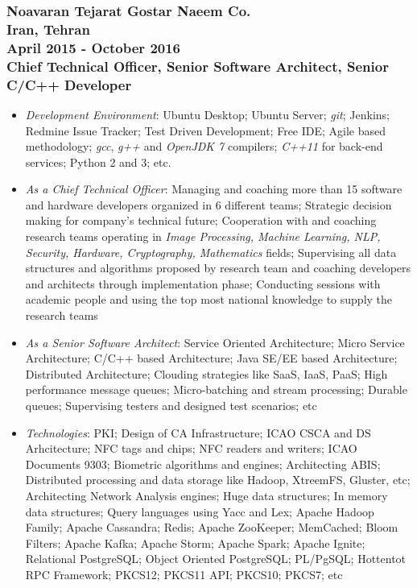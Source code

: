 \documentclass[10pt,a4paper]{article}
\begin{document}
\subsubsection{{\large Noavaran Tejarat Gostar Naeem Co.} \\ 
\textnormal{Iran, Tehran} \\ 
\textnormal{April 2015 - October 2016} \\ 
{Chief Technical Officer, Senior Software Architect, Senior C/C++ Developer}}
  \setlength{\leftskip}{0.5cm}
  \setlength{\rightskip}{1cm}
  \begin{itemize}
    \setlength{\rightskip}{1cm}
    \setlength\itemsep{0em}
    \item \small \textit {Development Environment}: Ubuntu Desktop; Ubuntu Server; \textit{git}; Jenkins; Redmine Issue Tracker; Test Driven Development; Free IDE; Agile based methodology; \textit {gcc}, \textit{g++} and \textit{OpenJDK 7} compilers; \textit{C++11} for back-end services; Python 2 and 3; etc.
    \item \small \textit {As a Chief Technical Officer}: Managing and coaching more than 15 software and hardware developers organized in 6 different teams; Strategic decision making for company's technical future; Cooperation with and coaching research teams operating in \textit {Image Processing, Machine Learning, NLP, Security, Hardware, Cryptography, Mathematics} fields; Supervising all data structures and algorithms proposed by research team and coaching developers and architects through implementation phase; Conducting sessions with academic people and using the top most national knowledge to supply the research teams
    \item \small \textit {As a Senior Software Architect}: Service Oriented Architecture; Micro Service Architecture; C/C++ based Architecture; Java SE/EE based Architecture; Distributed Architecture; Clouding strategies like SaaS, IaaS, PaaS; High performance message queues; Micro-batching and stream processing; Durable queues; Supervising testers and designed test scenarios; etc
    \item \small \textit {Technologies}: PKI; Design of CA Infrastructure; ICAO CSCA and DS Arhcitecture; NFC tags and chips; NFC readers and writers; ICAO Documents 9303; Biometric algorithms and engines; Architecting ABIS; Distributed processing and data storage like Hadoop, XtreemFS, Gluster, etc; Architecting Network Analysis engines; Huge data structures; In memory data structures; Query languages using Yacc and Lex; Apache Hadoop Family; Apache Cassandra; Redis; Apache ZooKeeper; MemCached; Bloom Filters; Apache Kafka; Apache Storm; Apache Spark; Apache Ignite; Relational PostgreSQL; Object Oriented PostgreSQL; PL/PgSQL; Hottentot RPC Framework; PKCS12; PKCS11 API; PKCS10; PKCS7; etc

\end{itemize}
\end{document}
